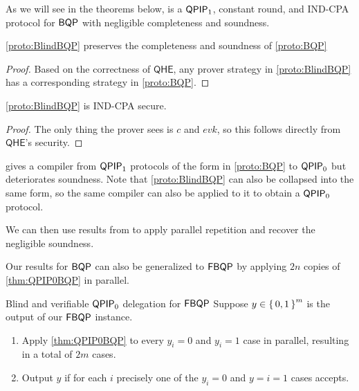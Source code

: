 As we will see in the theorems below,  is a $\operatorname{\mathsf{QPIP}}_1$, constant round, and IND-CPA protocol for $\operatorname{\mathsf{BQP}}$ with negligible completeness and soundness.

\begin{thm}
	\cref{proto:BlindBQP} preserves the completeness and soundness of \cref{proto:BQP}
\end{thm}
\begin{proof}
	Based on the correctness of $\mathsf{QHE}$, any prover strategy in \cref{proto:BlindBQP} has a corresponding strategy in \cref{proto:BQP}.
\end{proof}

\begin{thm}
	\cref{proto:BlindBQP} is IND-CPA secure.
\end{thm}
\begin{proof}
	The only thing the prover sees is $c$ and $evk$, so this follows directly from $\mathsf{QHE}$'s security.
\end{proof}

\cite{mahadev_delegation} gives a compiler from $\operatorname{\mathsf{QPIP}}_1$ protocols of the form in \cref{proto:BQP} to $\operatorname{\mathsf{QPIP}}_0$ but deteriorates soundness.
Note that \cref{proto:BlindBQP} can also be collapsed into the same form, so the same compiler can also be applied to it to obtain a $\operatorname{\mathsf{QPIP}}_0$ protocol.

We can then use results from \cite{parallelrep} to apply parallel repetition and recover the negligible soundness.

Our results for $\operatorname{\mathsf{BQP}}$ can also be generalized to $\operatorname{\mathsf{FBQP}}$ by applying $2n$ copies of \cref{thm:QPIP0BQP} in parallel.

\begin{protocol}{Blind and verifiable $\operatorname{\mathsf{QPIP}}_0$ delegation for $\operatorname{\mathsf{FBQP}}$}
	\label{QPIP0FBQP}
	Suppose $y\in\set{0,1}^m$ is the output of our $\operatorname{\mathsf{FBQP}}$ instance.
	\begin{enumerate}
		\item Apply \cref{thm:QPIP0BQP} to every $y_i=0$ and $y_i=1$ case in parallel, resulting in a total of $2m$ cases.
		\item Output $y$ if for each $i$ precisely one of the $y_i=0$ and $y=i=1$ cases accepts.
	\end{enumerate}
\end{protocol}

